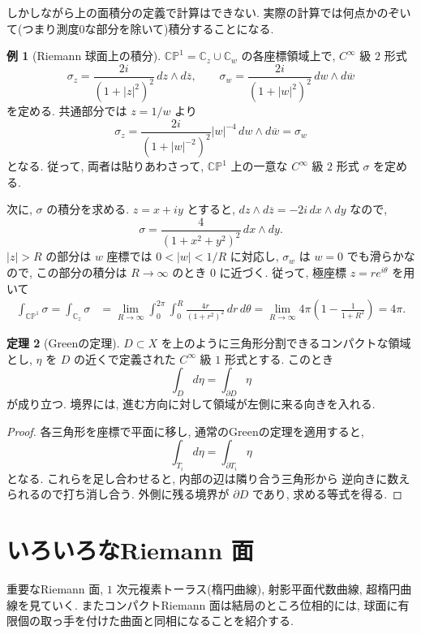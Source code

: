 \documentclass[dvipdfmx,a4paper,11pt]{article} %
\newcommand{\C}{\mathbb{C}}
\theoremstyle{definition}
\newtheorem{thm}{定理}[section]
\numberwithin{equation}{section}
\newtheorem{exa}[thm]{例}
\begin{document}
しかしながら上の面積分の定義で計算はできない. 
実際の計算では何点かのぞいて(つまり測度0な部分を除いて)積分することになる.

\begin{exa}[Riemann 球面上の積分]\label{O-M119}
$\C\mathbb P^1=\C_z\cup\C_w$ の各座標領域上で, 
$C^\infty$ 級 $2$ 形式
\[
\sigma_z=\frac{2i}{(1+|z|^2)^2}\,dz\wedge d\overline z,
\qquad
\sigma_w=\frac{2i}{(1+|w|^2)^2}\,dw\wedge d\overline w
\]
を定める.
共通部分では $z=1/w$ より
\[
\sigma_z
=\frac{2i}{(1+|w|^{-2})^2}|w|^{-4}
\,dw\wedge d\overline w
=\sigma_w
\]
となる.
従って, 両者は貼りあわさって, 
$\C\mathbb P^1$ 上の一意な $C^\infty$ 級 $2$ 形式 $\sigma$ を定める.

次に, $\sigma$ の積分を求める.
$z=x+iy$ とすると, $dz\wedge d\overline z=-2i\,dx\wedge dy$ なので, 
\[
\sigma=\frac{4}{(1+x^2+y^2)^2}\,dx\wedge dy.
\]
$|z|>R$ の部分は $w$ 座標では $0<|w|<1/R$ に対応し, 
$\sigma_w$ は $w=0$ でも滑らかなので, この部分の積分は
$R\to\infty$ のとき $0$ に近づく.
従って, 極座標 $z=re^{i\theta}$ を用いて
\[
\begin{aligned}
\int_{\C\mathbb P^1}\sigma
=
\int_{\mathbb C_z}\sigma
&=\lim_{R\to\infty}\int_0^{2\pi}\int_0^R
\frac{4r}{(1+r^2)^2}\,dr\,d\theta
=\lim_{R\to\infty}
4\pi\left(1-\frac{1}{1+R^2}\right)
=4\pi.
\end{aligned}
\]
\end{exa}


\begin{thm}[Greenの定理]\label{O-M120}
$D\subset X$ を上のように三角形分割できるコンパクトな領域とし, 
$\eta$ を $D$ の近くで定義された $C^\infty$ 級 $1$ 形式とする.
このとき
\[
\int_D d\eta=\int_{\partial D}\eta
\]
が成り立つ.
境界には, 進む方向に対して領域が左側に来る向きを入れる.
\end{thm}

\begin{proof}
各三角形を座標で平面に移し, 通常のGreenの定理を適用すると, 
\[
\int_{T_i}d\eta=\int_{\partial T_i}\eta
\]
となる.
これらを足し合わせると, 内部の辺は隣り合う三角形から
逆向きに数えられるので打ち消し合う.
外側に残る境界が $\partial D$ であり, 求める等式を得る.
\end{proof}


\newpage

\section{いろいろなRiemann 面}\label{O-S025}
重要なRiemann 面, $1$ 次元複素トーラス(楕円曲線), 射影平面代数曲線, 超楕円曲線を見ていく. 
またコンパクトRiemann 面は結局のところ位相的には, 球面に有限個の取っ手を付けた曲面と同相になることを紹介する. 
\end{document}
